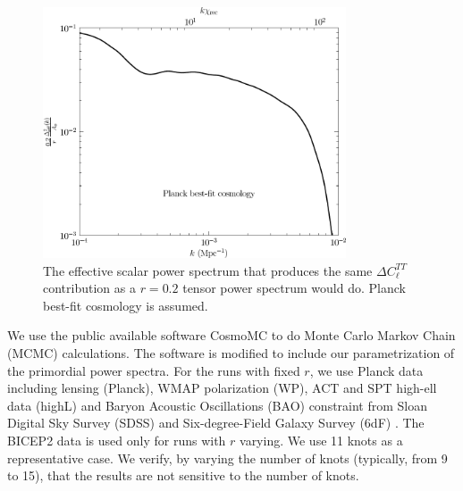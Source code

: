 \documentclass[11pt]{article}
\def \figwidth{0.8\textwidth}
\begin{document}
\begin{figure}
  \centering
  \includegraphics[width = \figwidth]{ten_eff_ps.pdf}
  \caption{The effective scalar power spectrum that produces the same $\Delta C_\ell^{TT}$ contribution as a $r=0.2$ tensor power spectrum would do. Planck best-fit cosmology is assumed. \label{fig:effps}}
\end{figure}


We use the public available software CosmoMC \cite{CosmoMC} to do Monte Carlo Markov Chain (MCMC) calculations. The software is modified to include our parametrization of the primordial power spectra. For the runs with fixed $r$, we use Planck data including lensing (Planck), WMAP polarization (WP), ACT and SPT high-ell data (highL) and Baryon Acoustic Oscillations (BAO) constraint from Sloan Digital Sky Survey (SDSS) \cite{SDSSDR9} and Six-degree-Field Galaxy Survey (6dF) \cite{Jones2004, Jones2009}. The BICEP2 data is used only for runs with $r$ varying. We use 11 knots as a representative case. We verify, by varying the number of knots (typically, from 9 to 15), that the results are not sensitive to the number of knots.
\end{document}
